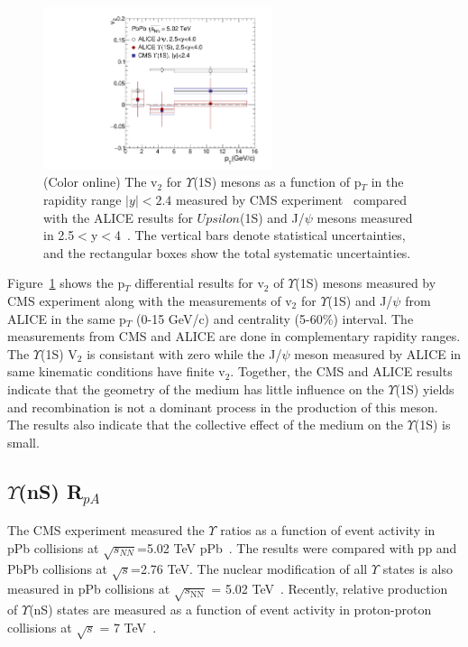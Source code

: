 \begin{figure}
  \begin{center}
\includegraphics[width=0.6\textwidth]{Figures/ExpOverview/Fig_CMS_ALICE_Y1S_5TeV_V2.pdf}
\caption{(Color online) The v$_{2}$ for $\Upsilon$(1S) mesons as a function of p$_{T}$ in the
  rapidity range $|y|<2.4$ measured by
  CMS experiment~\cite{CMS:2020efs} compared with the ALICE results for $Upsilon$(1S)
  and J/$\psi$ mesons measured in 2.5$<$y$<$4~\cite{ALICE:2019pox}.
  The vertical bars denote statistical uncertainties,
  and the rectangular boxes show the total systematic uncertainties.
}
\label{fig:Upsilon1SV2Compare}
\end{center}
\end{figure}

Figure~\ref{fig:Upsilon1SV2Compare} shows the p$_{T}$ differential results
for v$_{2}$ of $\Upsilon$(1S) mesons measured by CMS experiment along with the
measurements of v$_{2}$ for $\Upsilon$(1S) and J/$\psi$ from ALICE in the same
p$_{T}$ (0-15 GeV/c) and centrality (5-60$\%$) interval. The measurements from CMS
and ALICE are done in complementary rapidity ranges. The $\Upsilon$(1S) V$_{2}$ is
consistant with zero while the J/$\psi$ meson measured by ALICE in same kinematic
conditions have finite v$_{2}$. Together, the CMS and ALICE
results indicate that the geometry of the medium has little influence on the
$\Upsilon$(1S) yields and recombination is not a dominant process in the
production of this meson.
 The results also indicate that the collective effect of the medium on the 
$\Upsilon$(1S) is small.



\subsection{$\Upsilon$(nS) R$_{pA}$ }

The CMS experiment measured the $\Upsilon$ ratios as a function of event activity  
in pPb collisions at $\sqrt{s_{NN}}$=5.02 TeV pPb~\cite{CMS:2013jsu}.
The results were compared with pp and PbPb collisions at $\sqrt{s}$=2.76 TeV.
 The nuclear modification of all $\Upsilon$ states is also measured in pPb collisions
 at $\sqrt{s_\mathrm{NN}}$ = 5.02 TeV~\cite{CMS:2022wfi}.
 Recently, relative production of $\Upsilon$(nS) states are measured as a function of
 event activity in proton-proton collisions at $ \sqrt{s} $ = 7 TeV~\cite{CMS:2020fae}.

